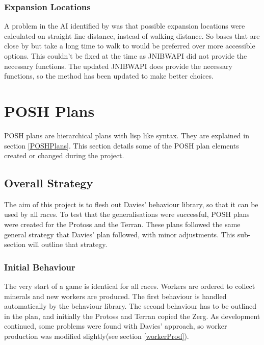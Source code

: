 \documentclass[11pt,openright,a4paper]{report}
\begin{document}
\subsubsection{Expansion Locations}
A problem in the AI identified by  was that possible expansion locations were calculated on straight line distance, instead of walking distance. So bases that are close by but take a long time to walk to would be preferred over more accessible options. This couldn't be fixed at the time as JNIBWAPI did not provide the necessary functions. The updated JNIBWAPI does provide the necessary functions, so the method has been updated to make better choices.

\section{POSH Plans}
POSH plans are hierarchical plans with lisp like syntax. They are explained in section \ref{POSHPlans}. This section details some of the POSH plan elements created or changed during the project.

\subsection{Overall Strategy}

The aim of this project is to flesh out Davies' behaviour library, so that it can be used by all races. To test that the generalisations were successful, POSH plans were created for the Protoss and the Terran. These plans followed the same general strategy that Davies' plan followed, with minor adjustments. This sub-section will outline that strategy.

\subsubsection{Initial Behaviour}
The very start of a game is identical for all races. Workers are ordered to collect minerals and new workers are produced. The first behaviour is handled automatically by the behaviour library. The second behaviour has to be outlined in the plan, and initially the Protoss and Terran copied the Zerg. As development continued, some problems were found with Davies' approach, so worker production was modified slightly(see section \ref{workerProd}).
\end{document}
